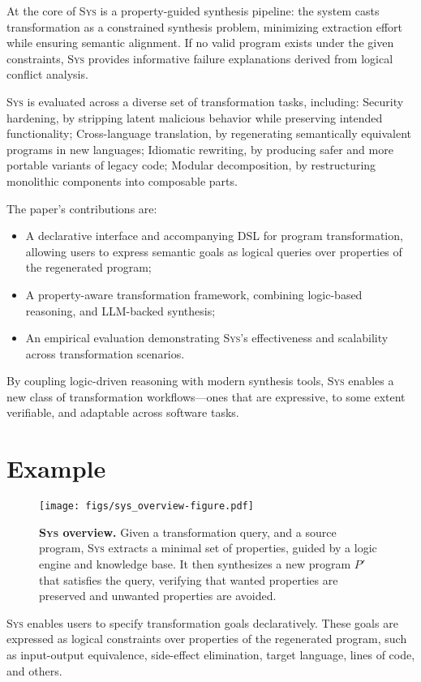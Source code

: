 \documentclass[sigplan]{acmart}
\newcommand{\sys}{{\scshape Sys}\xspace}
\begin{document}
At the core of \sys is a property-guided synthesis pipeline: the system casts
transformation as a constrained synthesis problem, minimizing extraction effort
while ensuring semantic alignment. If no valid program exists under the given
constraints, \sys provides informative failure explanations derived from
logical conflict analysis.

\sys is evaluated across a diverse set of transformation tasks, including:
	Security hardening, by stripping latent malicious behavior while preserving intended functionality;
	Cross-language translation, by regenerating semantically equivalent programs in new languages;
	Idiomatic rewriting, by producing safer and more portable variants of legacy code;
	Modular decomposition, by restructuring monolithic components into composable parts.

The paper's contributions are:
\begin{itemize}
 \item A declarative interface and accompanying DSL for program transformation, allowing users to express semantic goals as logical queries over properties of the regenerated program;
 \item A property-aware transformation framework, combining logic-based reasoning, and LLM-backed synthesis;
 \item An empirical evaluation demonstrating \sys’s effectiveness and scalability across transformation scenarios.
\end{itemize}

By coupling logic-driven reasoning with modern synthesis tools, \sys enables a
new class of transformation workflows---ones that are expressive, to some extent verifiable,
and adaptable across software tasks.

\section{Example}
\label{sec:example}
\begin{figure}[ht]
  \texttt{[image: figs/sys\_overview-figure.pdf]}
  \caption{\textbf{\sys overview.}
Given a transformation query, and a source program, \sys extracts a minimal set
  of properties,
  guided by a logic engine and knowledge base.
  It then synthesizes a new program $P'$ that satisfies the query, verifying
  that wanted properties are preserved and unwanted properties are avoided.
}
\end{figure}

\sys enables users to specify transformation goals declaratively.
These goals are expressed as logical constraints over properties of the
regenerated program, such as input-output equivalence, side-effect elimination,
target language, lines of code, and others.
\end{document}
